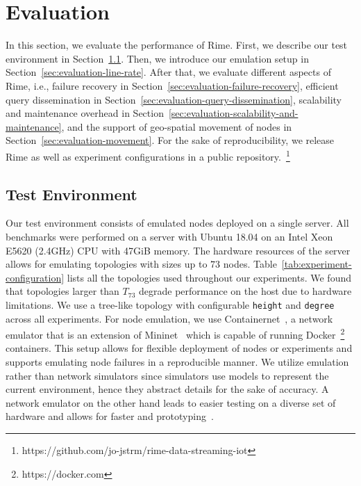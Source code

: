 \section{Evaluation}
\label{sec:evaluation}
% 
In this section, we evaluate the performance of Rime. First, we describe our test environment in Section~\ref{subsec:test_env}. Then, we introduce our emulation setup in Section~\ref{sec:evaluation-line-rate}.
After that, we evaluate different aspects of Rime, i.e., failure recovery in Section~\ref{sec:evaluation-failure-recovery}, efficient query dissemination in Section~\ref{sec:evaluation-query-dissemination}, scalability and maintenance overhead in Section~\ref{sec:evaluation-scalability-and-maintenance}, and the support of geo-spatial movement of nodes in Section~\ref{sec:evaluation-movement}.
For the sake of reproducibility, we release Rime as well as experiment configurations in a public repository.~\footnote{https://github.com/jo-jstrm/rime-data-streaming-iot}

\subsection{Test Environment}
\label{subsec:test_env}
% 
Our test environment consists of emulated nodes deployed on a single server. All benchmarks were performed on a server with Ubuntu 18.04 on an Intel Xeon E5620 (2.4GHz) CPU with 47GiB memory. 
The hardware resources of the server allows for emulating topologies with sizes up to $73$ nodes. Table~\ref{tab:experiment-configuration} lists all the topologies used throughout our experiments. We found that topologies larger than $T_{73}$ degrade performance on the host due to hardware limitations.
We use a tree-like topology with configurable \texttt{height} and \texttt{degree} across all experiments.
For node emulation, we use Containernet~\cite{peuster_medicine_2016}, 
a network emulator that is an extension of Mininet~\cite{lantz_network_2010} which is capable of running 
Docker~\footnote{https://docker.com} containers. This setup allows for flexible deployment 
of nodes or experiments and supports emulating node failures in a reproducible manner. We utilize emulation rather than network simulators since simulators use models to represent the current environment, hence they abstract details for the sake of accuracy. A network emulator on the other hand leads to easier testing on a diverse set of hardware and allows for faster and prototyping~\cite{symeonides2020fogify}.

